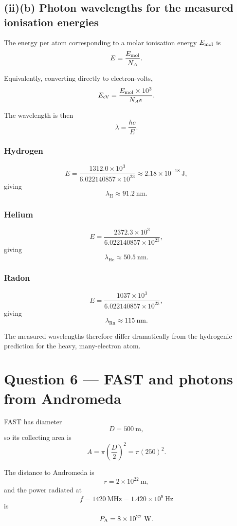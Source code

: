 \documentclass[11pt,a4paper]{article}
\begin{document}
\subsection{(ii)(b) Photon wavelengths for the measured ionisation energies}

The energy per atom corresponding to a molar ionisation energy $E_{\rm mol}$ is
\[
E=\frac{E_{\rm mol}}{N_A}.
\]

Equivalently, converting directly to electron-volts,
\[
E_{\rm eV}
=
\frac{E_{\rm mol}\times10^3}
{N_Ae}.
\]

The wavelength is then
\[
\lambda=\frac{hc}{E}.
\]

\subsubsection*{Hydrogen}

\[
E
=
\frac{1312.0\times10^3}
{6.022140857\times10^{23}}
\approx2.18\times10^{-18}\ \mathrm J,
\]
giving
\[
\boxed{\lambda_{\mathrm H}\approx91.2\ \mathrm{nm}}.
\]

\subsubsection*{Helium}

\[
E
=
\frac{2372.3\times10^3}
{6.022140857\times10^{23}},
\]
giving
\[
\boxed{\lambda_{\mathrm{He}}\approx50.5\ \mathrm{nm}}.
\]

\subsubsection*{Radon}

\[
E
=
\frac{1037\times10^3}
{6.022140857\times10^{23}},
\]
giving
\[
\boxed{\lambda_{\mathrm{Rn}}\approx115\ \mathrm{nm}}.
\]

The measured wavelengths therefore differ dramatically from the hydrogenic
prediction for the heavy, many-electron atom.

\section{Question 6 --- FAST and photons from Andromeda}

FAST has diameter
\[
D=500\ \mathrm m,
\]
so its collecting area is
\[
A=\pi\left(\frac D2\right)^2
=\pi(250)^2.
\]

The distance to Andromeda is
\[
r=2\times10^{22}\ \mathrm m,
\]
and the power radiated at
\[
f=1420\ \mathrm{MHz}
=1.420\times10^9\ \mathrm{Hz}
\]
is
\[
P_{\rm A}=8\times10^{27}\ \mathrm W.
\]
\end{document}
